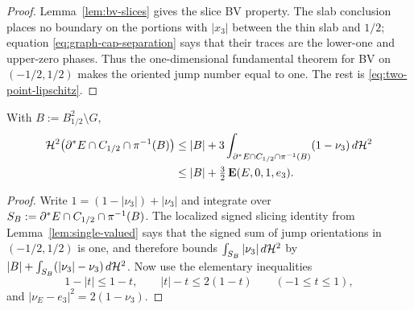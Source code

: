 \begin{proof}
Lemma~\ref{lem:bv-slices} gives the slice BV property.  The slab conclusion
places no boundary on the portions with $|x_3|$ between the thin slab and
$1/2$; equation \eqref{eq:graph-cap-separation} says that their traces are
the lower-one and upper-zero phases.
Thus the one-dimensional fundamental theorem for BV on $(-1/2,1/2)$ makes
the oriented jump number equal to one.  The rest is
\eqref{eq:two-point-lipschitz}.
\end{proof}

\begin{lemma}\label{lem:bad-base-area}
With $B:=B^2_{1/2}\setminus G$,
\begin{equation}\label{eq:bad-base-area}
\begin{aligned}
  \mathcal H^2\bigl(\partial^* E\cap C_{1/2}\cap\pi^{-1}(B)\bigr)
  &\le|B|+3\int_{\partial^* E\cap C_{1/2}\cap\pi^{-1}(B)}
                    (1-\nu_3)\,d\mathcal H^2\\
  &\le|B|+\tfrac32\operatorname{\mathbf E}(E,0,1,e_3).
\end{aligned}
\end{equation}
\end{lemma}

\begin{proof}
Write $1=(1-|\nu_3|)+|\nu_3|$ and integrate over
$S_B:=\partial^* E\cap C_{1/2}\cap\pi^{-1}(B)$.  The localized signed slicing
identity from Lemma~\ref{lem:single-valued} says that the signed sum of jump
orientations in $(-1/2,1/2)$ is one, and therefore bounds
$\int_{S_B}|\nu_3|\,d\mathcal H^2$ by
$|B|+\int_{S_B}(|\nu_3|-\nu_3)\,d\mathcal H^2$.  Now use the elementary
inequalities
\begin{equation}\label{eq:elementary-nu3}
  1-|t|\le1-t,
  \qquad
  |t|-t\le2(1-t)
  \qquad(-1\le t\le1),
\end{equation}
and $|\nu_E-e_3|^2=2(1-\nu_3)$.
\end{proof}

